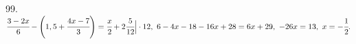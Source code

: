 99. $\cfrac{3-2x}{6}-\left(1,5+\cfrac{4x-7}{3}\right)=\cfrac{x}{2}+2\cfrac{5}{12}\Big|\cdot12,\ 6-4x-18-16x+28=6x+29,\ -26x=13,\ x=-\cfrac{1}{2}.$\\
